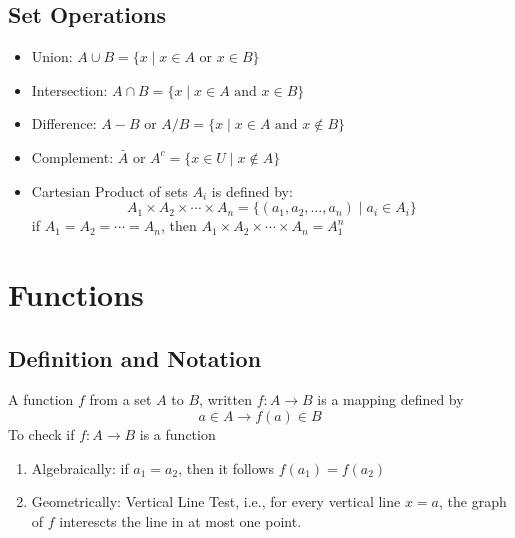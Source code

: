 \documentclass[11pt]{article}
\begin{document}
\subsection{Set Operations}
\begin{itemize}
    \item Union: $A\cup B = \{x \mid x \in A \text{ or } x \in B\}$ 
    \item Intersection: $A\cap B = \{x \mid x \in A \text{ and } x \in B\}$ 
    \item Difference: $A - B \text{ or }A/B = \{x \mid x \in A \text{ and } x \notin B\}$
    \item Complement: $\bar{A} \text{ or } A^c = \{x \in U \mid x \notin A\}$
    \item Cartesian Product of sets $A_i$ is defined by:
        \[
            A_1\times A_2 \times \cdots \times A_n  = \{ (a_1, a_2, \dots, a_n) \mid a_i \in A_i \}
        \]
        if $A_1 = A_2 = \cdots = A_n$, then $A_1\times A_2 \times \cdots \times A_n = A_{1}^n$
    \end{itemize}
\section{Functions}
\subsection{Definition and Notation}
A function $f$ from a set $A$ to $B$, written $f: A\to B$ is a mapping defined by
\[
    a \in A \to f(a) \in B
\]
To check if $f: A\to B$ is a function
\begin{enumerate}
    \item Algebraically: if $a_1 = a_2$, then it follows $f(a_1) = f(a_2)$
    \item Geometrically: Vertical Line Test, i.e., for every vertical line $x = a$, the graph of $f$ interescts the line in at most one point.
\end{enumerate}
\end{document}
